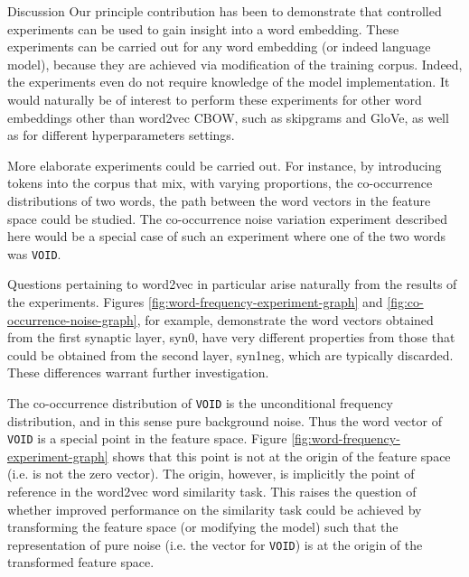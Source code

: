 \documentclass{article} %
\newcommand{\word}[1]{\texttt{#1}}
\begin{document}
\begin{section}{Discussion}\label{future-directions}
Our principle contribution has been to demonstrate that controlled experiments can be used to gain insight into a word embedding.
These experiments can be carried out for any word embedding (or indeed language model), because they are achieved via modification of the training corpus.
Indeed, the experiments even do not require knowledge of the model implementation.
It would naturally be of interest to perform these experiments for other word embeddings other than word2vec CBOW, such as skipgrams and GloVe, as well as for different hyperparameters settings.

More elaborate experiments could be carried out.
For instance, by introducing tokens into the corpus that mix, with varying proportions, the co-occurrence distributions of two words, the path between the word vectors in the feature space could be studied.
The co-occurrence noise variation experiment described here would be a special case of such an experiment where one of the two words was \word{VOID}.

Questions pertaining to word2vec in particular arise naturally from the results of the experiments.
Figures \ref{fig:word-frequency-experiment-graph} and \ref{fig:co-occurrence-noise-graph}, for example, demonstrate the word vectors obtained from the first synaptic layer, syn0, have very different properties from those that could be obtained from the second layer, syn1neg, which are typically discarded.
These differences warrant further investigation.

The co-occurrence distribution of \word{VOID} is the unconditional frequency distribution, and in this sense pure background noise.
Thus the word vector of \word{VOID} is a special point in the feature space.
Figure \ref{fig:word-frequency-experiment-graph} shows that this point is not at the origin of the feature space (i.e. is not the zero vector).
The origin, however, is implicitly the point of reference in the word2vec word similarity task.
This raises the question of whether improved performance on the similarity task could be achieved by transforming the feature space (or modifying the model) such that the representation of pure noise (i.e. the vector for \word{VOID}) is at the origin of the transformed feature space. 



\end{section}

\clearpage
\footnotesize


\end{document}
